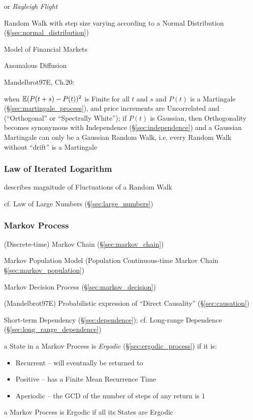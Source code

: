 or \emph{Rayleigh Flight}

Random Walk with step size varying according to a Normal Distribution
(\S\ref{sec:normal_distribution})

Model of Financial Markets

Anomalous Diffusion

Mandelbrot97E, Ch.20:

when $\mathbb{E}(P(t + s) - P(t))^2$ is Finite for all $t$ and $s$ and $P(t)$ is a
Martingale (\S\ref{sec:martingale_process}), and price increments are
Uncorrelated and (``Orthogonal'' or ``Spectrally White''); if $P(t)$ is
Gaussian, then Orthogonality becomes synonymous with Independence
(\S\ref{sec:independence}) and a Gaussian Martingale can only be a Gaussian
Random Walk, i.e. every Random Walk without ``drift'' is a Martingale



\subsubsection{Law of Iterated Logarithm}\label{sec:iterated_logarithm}

describes magnitude of Fluctuations of a Random Walk

cf. Law of Large Numbers (\S\ref{sec:large_numbers})



\subsubsection{Markov Process}\label{sec:markov_process}


\fist (Discrete-time) Markov Chain (\S\ref{sec:markov_chain})

\fist Markov Population Model (Population Continuous-time Markov Chain
\S\ref{sec:markov_population})

\fist Markov Decision Process (\S\ref{sec:markov_decision})

(Mandelbrot97E) Probabilistic expression of ``Direct Causality''
(\S\ref{sec:causation})

Short-term Dependency (\S\ref{sec:dependence}); cf. Long-range Dependence
(\S\ref{sec:long_range_dependence})

a State in a Markov Process is \emph{Ergodic} (\S\ref{sec:ergodic_process}) if
it is:
\begin{itemize}
  \item Recurrent -- will eventually be returned to
  \item Positive -- has a Finite Mean Recurrence Time
  \item Aperiodic -- the GCD of the number of steps of any return is $1$
\end{itemize}
a Markov Process is Ergodic if all its States are Ergodic

